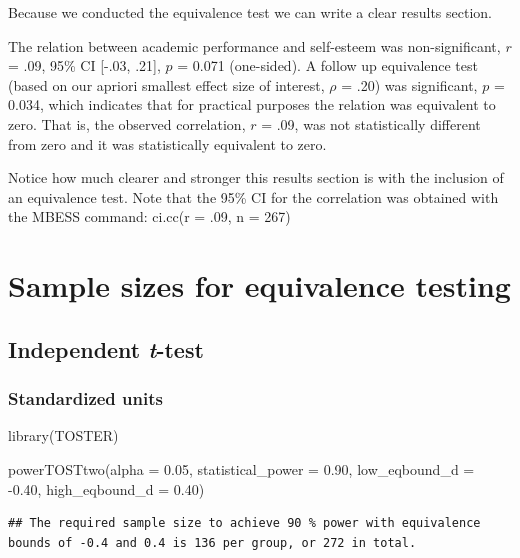 \documentclass[
]{krantz}
\makeatletter
\newenvironment{Shaded}{\begin{snugshade}}{\end{snugshade}}
\newcommand{\AttributeTok}[1]{\textcolor[rgb]{0.61,0.61,0.61}{#1}}
\newcommand{\FloatTok}[1]{\textcolor[rgb]{0.06,0.06,0.06}{#1}}
\newcommand{\FunctionTok}[1]{\textcolor[rgb]{0,0,0}{#1}}
\newcommand{\NormalTok}[1]{#1}
\newcommand{\SpecialCharTok}[1]{\textcolor[rgb]{0,0,0}{#1}}
\newenvironment{kframe}{%
\medskip{}
\setlength{\fboxsep}{.8em}
 \def\at@end@of@kframe{}%
 \ifinner\ifhmode%
  \def\at@end@of@kframe{\end{minipage}}%
  \begin{minipage}{\columnwidth}%
 \fi\fi%
 \def\FrameCommand##1{\hskip\@totalleftmargin \hskip-\fboxsep
 \colorbox{shadecolor}{##1}\hskip-\fboxsep
     \hskip-\linewidth \hskip-\@totalleftmargin \hskip\columnwidth}%
 \MakeFramed {\advance\hsize-\width
   \@totalleftmargin\z@ \linewidth\hsize
   \@setminipage}}%
 {\par\unskip\endMakeFramed%
 \at@end@of@kframe}
\renewenvironment{Shaded}{\begin{kframe}}{\end{kframe}}
\makeatother
\begin{document}
Because we conducted the equivalence test we can write a clear results section.

The relation between academic performance and self-esteem was non-significant, \(r\) = .09, 95\% CI {[}-.03, .21{]}, \(p\) = 0.071 (one-sided). A follow up equivalence test (based on our apriori smallest effect size of interest, \(\rho\) = .20) was significant, \(p\) = 0.034, which indicates that for practical purposes the relation was equivalent to zero. That is, the observed correlation, \(r\) = .09, was not statistically different from zero and it was statistically equivalent to zero.

Notice how much clearer and stronger this results section is with the inclusion of an equivalence test. Note that the 95\% CI for the correlation was obtained with the MBESS command: ci.cc(r = .09, n = 267)

\hypertarget{sample-sizes-for-equivalence-testing}{%
\section{Sample sizes for equivalence testing}\label{sample-sizes-for-equivalence-testing}}

\hypertarget{independent-t-test}{%
\subsection{\texorpdfstring{Independent \emph{t}-test}{Independent t-test}}\label{independent-t-test}}

\hypertarget{standardized-units-3}{%
\subsubsection{Standardized units}\label{standardized-units-3}}

\begin{Shaded}
\begin{Highlighting}[]
\FunctionTok{library}\NormalTok{(TOSTER)}

\FunctionTok{powerTOSTtwo}\NormalTok{(}\AttributeTok{alpha =} \FloatTok{0.05}\NormalTok{,}
             \AttributeTok{statistical\_power =} \FloatTok{0.90}\NormalTok{,}
             \AttributeTok{low\_eqbound\_d =} \SpecialCharTok{{-}}\FloatTok{0.40}\NormalTok{,}
             \AttributeTok{high\_eqbound\_d =} \FloatTok{0.40}\NormalTok{)}
\end{Highlighting}
\end{Shaded}

\begin{verbatim}
## The required sample size to achieve 90 % power with equivalence bounds of -0.4 and 0.4 is 136 per group, or 272 in total.
\end{verbatim}
\end{document}
